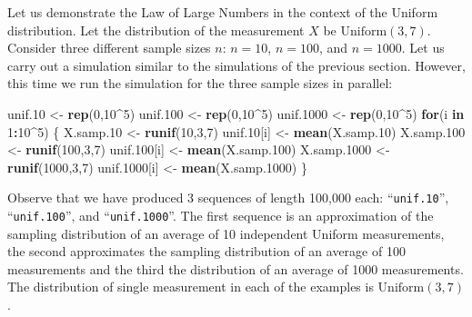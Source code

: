 \documentclass[]{krantz}
\makeatletter
\newenvironment{Shaded}{\begin{snugshade}}{\end{snugshade}}
\newcommand{\KeywordTok}[1]{\textcolor[rgb]{0.13,0.29,0.53}{\textbf{#1}}}
\newcommand{\DecValTok}[1]{\textcolor[rgb]{0.00,0.00,0.81}{#1}}
\newcommand{\StringTok}[1]{\textcolor[rgb]{0.31,0.60,0.02}{#1}}
\newcommand{\ControlFlowTok}[1]{\textcolor[rgb]{0.13,0.29,0.53}{\textbf{#1}}}
\newcommand{\OperatorTok}[1]{\textcolor[rgb]{0.81,0.36,0.00}{\textbf{#1}}}
\newcommand{\NormalTok}[1]{#1}
\newenvironment{kframe}{%
\medskip{}
\setlength{\fboxsep}{.8em}
 \def\at@end@of@kframe{}%
 \ifinner\ifhmode%
  \def\at@end@of@kframe{\end{minipage}}%
  \begin{minipage}{\columnwidth}%
 \fi\fi%
 \def\FrameCommand##1{\hskip\@totalleftmargin \hskip-\fboxsep
 \colorbox{shadecolor}{##1}\hskip-\fboxsep
     \hskip-\linewidth \hskip-\@totalleftmargin \hskip\columnwidth}%
 \MakeFramed {\advance\hsize-\width
   \@totalleftmargin\z@ \linewidth\hsize
   \@setminipage}}%
 {\par\unskip\endMakeFramed%
 \at@end@of@kframe}
\renewenvironment{Shaded}{\begin{kframe}}{\end{kframe}}
\theoremstyle{definition}
\theoremstyle{definition}
\theoremstyle{definition}
\theoremstyle{remark}
\makeatother
\begin{document}
Let us demonstrate the Law of Large Numbers in the context of the
Uniform distribution. Let the distribution of the measurement \(X\) be
\(\mathrm{Uniform}(3,7)\). Consider three different sample sizes \(n\):
\(n=10\), \(n=100\), and \(n=1000\). Let us carry out a simulation
similar to the simulations of the previous section. However, this time
we run the simulation for the three sample sizes in parallel:

\begin{Shaded}
\begin{Highlighting}[]
\NormalTok{unif.}\DecValTok{10}\NormalTok{ <-}\StringTok{ }\KeywordTok{rep}\NormalTok{(}\DecValTok{0}\NormalTok{,}\DecValTok{10}\OperatorTok{^}\DecValTok{5}\NormalTok{)}
\NormalTok{unif.}\DecValTok{100}\NormalTok{ <-}\StringTok{ }\KeywordTok{rep}\NormalTok{(}\DecValTok{0}\NormalTok{,}\DecValTok{10}\OperatorTok{^}\DecValTok{5}\NormalTok{)}
\NormalTok{unif.}\DecValTok{1000}\NormalTok{ <-}\StringTok{ }\KeywordTok{rep}\NormalTok{(}\DecValTok{0}\NormalTok{,}\DecValTok{10}\OperatorTok{^}\DecValTok{5}\NormalTok{)}
\ControlFlowTok{for}\NormalTok{(i }\ControlFlowTok{in} \DecValTok{1}\OperatorTok{:}\DecValTok{10}\OperatorTok{^}\DecValTok{5}\NormalTok{) \{}
\NormalTok{  X.samp.}\DecValTok{10}\NormalTok{ <-}\StringTok{ }\KeywordTok{runif}\NormalTok{(}\DecValTok{10}\NormalTok{,}\DecValTok{3}\NormalTok{,}\DecValTok{7}\NormalTok{)}
\NormalTok{  unif.}\DecValTok{10}\NormalTok{[i] <-}\StringTok{ }\KeywordTok{mean}\NormalTok{(X.samp.}\DecValTok{10}\NormalTok{)}
\NormalTok{  X.samp.}\DecValTok{100}\NormalTok{ <-}\StringTok{ }\KeywordTok{runif}\NormalTok{(}\DecValTok{100}\NormalTok{,}\DecValTok{3}\NormalTok{,}\DecValTok{7}\NormalTok{)}
\NormalTok{  unif.}\DecValTok{100}\NormalTok{[i] <-}\StringTok{ }\KeywordTok{mean}\NormalTok{(X.samp.}\DecValTok{100}\NormalTok{)}
\NormalTok{  X.samp.}\DecValTok{1000}\NormalTok{ <-}\StringTok{ }\KeywordTok{runif}\NormalTok{(}\DecValTok{1000}\NormalTok{,}\DecValTok{3}\NormalTok{,}\DecValTok{7}\NormalTok{)}
\NormalTok{  unif.}\DecValTok{1000}\NormalTok{[i] <-}\StringTok{ }\KeywordTok{mean}\NormalTok{(X.samp.}\DecValTok{1000}\NormalTok{)}
\NormalTok{\}}
\end{Highlighting}
\end{Shaded}

Observe that we have produced 3 sequences of length 100,000 each:
``\texttt{unif.10}'', ``\texttt{unif.100}'', and ``\texttt{unif.1000}''.
The first sequence is an approximation of the sampling distribution of
an average of 10 independent Uniform measurements, the second
approximates the sampling distribution of an average of 100 measurements
and the third the distribution of an average of 1000 measurements. The
distribution of single measurement in each of the examples is
\(\mathrm{Uniform}(3,7)\).
\end{document}
